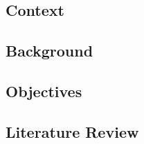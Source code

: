 %
%
\subsection{Context}

\subsection{Background}

\subsection{Objectives}

\subsection{Literature Review}
